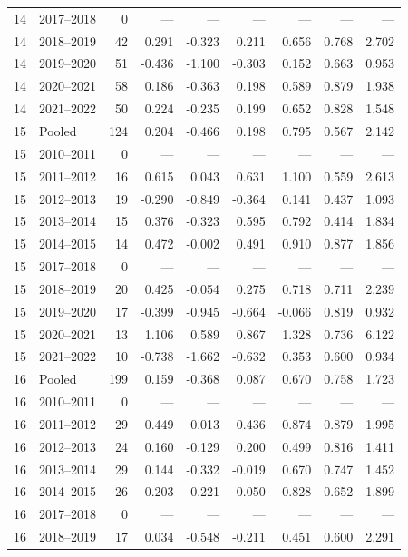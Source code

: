 \begin{longtable}{llrrrrrrr}
14 & 2017--2018 & 0 & --- & --- & --- & --- & --- & --- \\
14 & 2018--2019 & 42 & 0.291 & -0.323 & 0.211 & 0.656 & 0.768 & 2.702 \\
14 & 2019--2020 & 51 & -0.436 & -1.100 & -0.303 & 0.152 & 0.663 & 0.953 \\
14 & 2020--2021 & 58 & 0.186 & -0.363 & 0.198 & 0.589 & 0.879 & 1.938 \\
14 & 2021--2022 & 50 & 0.224 & -0.235 & 0.199 & 0.652 & 0.828 & 1.548 \\
15 & Pooled & 124 & 0.204 & -0.466 & 0.198 & 0.795 & 0.567 & 2.142 \\
15 & 2010--2011 & 0 & --- & --- & --- & --- & --- & --- \\
15 & 2011--2012 & 16 & 0.615 & 0.043 & 0.631 & 1.100 & 0.559 & 2.613 \\
15 & 2012--2013 & 19 & -0.290 & -0.849 & -0.364 & 0.141 & 0.437 & 1.093 \\
15 & 2013--2014 & 15 & 0.376 & -0.323 & 0.595 & 0.792 & 0.414 & 1.834 \\
15 & 2014--2015 & 14 & 0.472 & -0.002 & 0.491 & 0.910 & 0.877 & 1.856 \\
15 & 2017--2018 & 0 & --- & --- & --- & --- & --- & --- \\
15 & 2018--2019 & 20 & 0.425 & -0.054 & 0.275 & 0.718 & 0.711 & 2.239 \\
15 & 2019--2020 & 17 & -0.399 & -0.945 & -0.664 & -0.066 & 0.819 & 0.932 \\
15 & 2020--2021 & 13 & 1.106 & 0.589 & 0.867 & 1.328 & 0.736 & 6.122 \\
15 & 2021--2022 & 10 & -0.738 & -1.662 & -0.632 & 0.353 & 0.600 & 0.934 \\
16 & Pooled & 199 & 0.159 & -0.368 & 0.087 & 0.670 & 0.758 & 1.723 \\
16 & 2010--2011 & 0 & --- & --- & --- & --- & --- & --- \\
16 & 2011--2012 & 29 & 0.449 & 0.013 & 0.436 & 0.874 & 0.879 & 1.995 \\
16 & 2012--2013 & 24 & 0.160 & -0.129 & 0.200 & 0.499 & 0.816 & 1.411 \\
16 & 2013--2014 & 29 & 0.144 & -0.332 & -0.019 & 0.670 & 0.747 & 1.452 \\
16 & 2014--2015 & 26 & 0.203 & -0.221 & 0.050 & 0.828 & 0.652 & 1.899 \\
16 & 2017--2018 & 0 & --- & --- & --- & --- & --- & --- \\
16 & 2018--2019 & 17 & 0.034 & -0.548 & -0.211 & 0.451 & 0.600 & 2.291 \\

\end{longtable}
